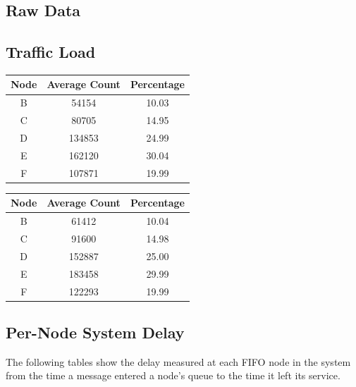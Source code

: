\documentclass{article}
\begin{document}
\newpage
\begin{appendices}
\section{Raw Data}
\label{appendix:Data}

\subsection*{Traffic Load}
\begin{minipage}{0.5\textwidth}
\centering
\begin{tabular}{|c|c|c|} \hline
\textbf{Node} & \textbf{Average Count} & \textbf{Percentage} \\ \hline
B & 54154 & 10.03 \\ \hline
C & 80705 & 14.95 \\ \hline
D & 134853 & 24.99 \\ \hline
E & 162120 & 30.04 \\ \hline
F & 107871 & 19.99 \\ \hline
\end{tabular}
\label{tab:appTrafficA}
\end{minipage}
\begin{minipage}{0.5\textwidth}
\centering
\begin{tabular}{|c|c|c|} \hline
\textbf{Node} & \textbf{Average Count} & \textbf{Percentage} \\ \hline
B & 61412 & 10.04 \\ \hline
C & 91600 & 14.98 \\ \hline
D & 152887 & 25.00 \\ \hline
E & 183458 & 29.99 \\ \hline
F & 122293 & 19.99 \\ \hline
\end{tabular}
\label{tab:appTrafficB}
\end{minipage}

\subsection*{Per-Node System Delay}
The following tables show the delay measured at each FIFO node in the system from the time a message entered a node's queue to the time it left its service.


\end{appendices}
\end{document}
